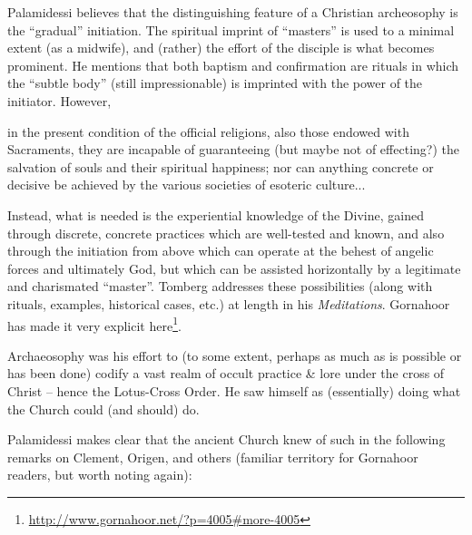 Palamidessi believes that the distinguishing feature of a Christian archeosophy is the ``gradual'' initiation. The spiritual imprint of ``masters'' is used to a minimal extent (as a midwife), and (rather) the effort of the disciple is what becomes prominent. He mentions that both baptism and confirmation are rituals in which the ``subtle body'' (still impressionable) is imprinted with the power of the initiator. However,

\begin{quotex}
in the present condition of the official religions, also those endowed with Sacraments, they are incapable of guaranteeing (but maybe not of effecting?) the salvation of souls and their spiritual happiness; nor can anything concrete or decisive be achieved by the various societies of esoteric culture...
\end{quotex}


Instead, what is needed is the experiential knowledge of the Divine, gained through discrete, concrete practices which are well-tested and known, and also through the initiation from above which can operate at the behest of angelic forces and ultimately God, but which can be assisted horizontally by a legitimate and charismated ``master''. Tomberg addresses these possibilities (along with rituals, examples, historical cases, etc.) at length in his \emph{Meditations}. Gornahoor has made it very explicit here\footnote{\url{http://www.gornahoor.net/?p=4005\#more-4005}}.

Archaeosophy was his effort to (to some extent, perhaps as much as is possible or has been done) codify a vast realm of occult practice \& lore under the cross of Christ -- hence the Lotus-Cross Order. He saw himself as (essentially) doing what the Church could (and should) do.

Palamidessi makes clear that the ancient Church knew of such in the following remarks on Clement, Origen, and others (familiar territory for Gornahoor readers, but worth noting again):

